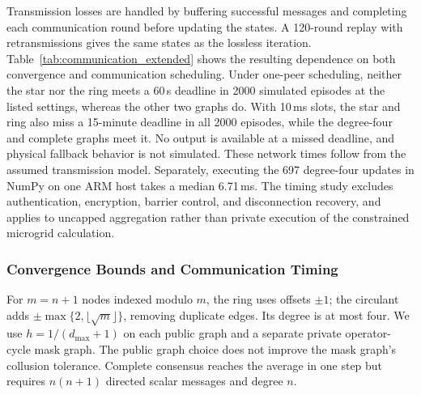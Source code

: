 \documentclass[journal]{IEEEtran}
\begin{document}
\begin{table}[t]
\centering
\caption{Uncapped aggregation for $n=100$ and $\Delta=0.001$\,MW with 1\,ms transmission/acknowledgment slots, independent 20\% attempt loss, and reliable retries. Message counts exclude mask exchange; modeled times include cycle-mask exchange under parallel-link or one-peer-per-node scheduling.}
\label{tab:communication_extended}
\end{table}

Transmission losses are handled by buffering successful messages and completing each communication round before updating the states. A 120-round replay with retransmissions gives the same states as the lossless iteration. Table~\ref{tab:communication_extended} shows the resulting dependence on both convergence and communication scheduling. Under one-peer scheduling, neither the star nor the ring meets a 60\,s deadline in 2000 simulated episodes at the listed settings, whereas the other two graphs do. With 10\,ms slots, the star and ring also miss a 15-minute deadline in all 2000 episodes, while the degree-four and complete graphs meet it. No output is available at a missed deadline, and physical fallback behavior is not simulated. These network times follow from the assumed transmission model. Separately, executing the 697 degree-four updates in NumPy on one ARM host takes a median 6.71\,ms. The timing study excludes authentication, encryption, barrier control, and disconnection recovery, and applies to uncapped aggregation rather than private execution of the constrained microgrid calculation.

\subsubsection{Convergence Bounds and Communication Timing}
For $m=n+1$ nodes indexed modulo $m$, the ring uses offsets $\pm1$; the circulant adds $\pm\max\{2,\lfloor\sqrt m\rfloor\}$, removing duplicate edges. Its degree is at most four. We use $h=1/(d_{\max}+1)$ on each public graph and a separate private operator-cycle mask graph. The public graph choice does not improve the mask graph's collusion tolerance. Complete consensus reaches the average in one step but requires $n(n+1)$ directed scalar messages and degree $n$.
\end{document}
